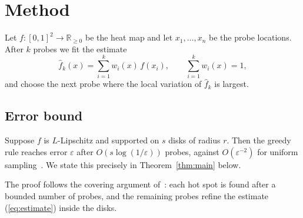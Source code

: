 \section{Method}\label{sec:method}
Let $f\colon [0,1]^2 \to \mathbb{R}_{\ge 0}$ be the heat map and let
$x_1,\dots,x_n$ be the probe locations. After $k$ probes we fit the estimate
\begin{equation}\label{eq:estimate}
  \hat f_k(x) = \sum_{i=1}^{k} w_i(x)\, f(x_i),
  \qquad \sum_{i=1}^{k} w_i(x) = 1,
\end{equation}
and choose the next probe where the local variation of $\hat f_k$ is largest.

\subsection{Error bound}\label{sec:bound}
Suppose $f$ is $L$-Lipschitz and supported on $s$ disks of radius $r$.
Then the greedy rule reaches error $\varepsilon$ after
$O\!\left(s \log(1/\varepsilon)\right)$ probes, against
$O\!\left(\varepsilon^{-2}\right)$ for uniform sampling~\cite{donoho2006}.
We state this precisely in Theorem~\ref{thm:main} below.

The proof follows the covering argument of~\cite{candes2006}: each hot spot is
found after a bounded number of probes, and the remaining probes refine the
estimate (\ref{eq:estimate}) inside the disks.
